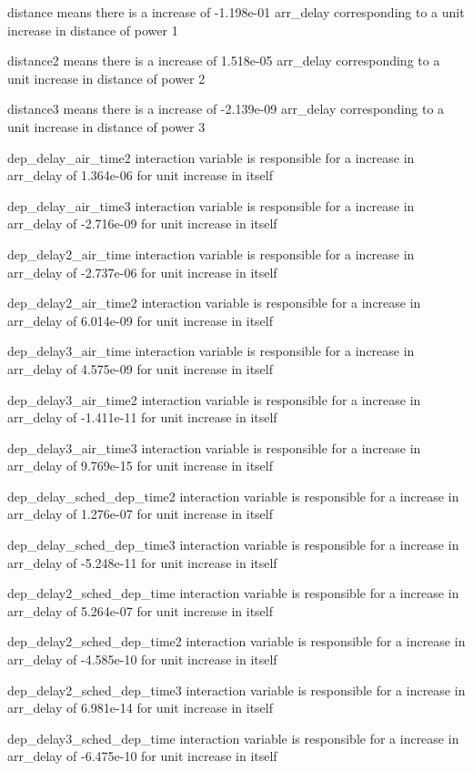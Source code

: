 \documentclass[
]{article}
\begin{document}
distance means there is a increase of -1.198e-01 arr\_delay
corresponding to a unit increase in distance of power 1

distance2 means there is a increase of 1.518e-05 arr\_delay
corresponding to a unit increase in distance of power 2

distance3 means there is a increase of -2.139e-09 arr\_delay
corresponding to a unit increase in distance of power 3

dep\_delay\_air\_time2 interaction variable is responsible for a
increase in arr\_delay of 1.364e-06 for unit increase in itself

dep\_delay\_air\_time3 interaction variable is responsible for a
increase in arr\_delay of -2.716e-09 for unit increase in itself

dep\_delay2\_air\_time interaction variable is responsible for a
increase in arr\_delay of -2.737e-06 for unit increase in itself

dep\_delay2\_air\_time2 interaction variable is responsible for a
increase in arr\_delay of 6.014e-09 for unit increase in itself

dep\_delay3\_air\_time interaction variable is responsible for a
increase in arr\_delay of 4.575e-09 for unit increase in itself

dep\_delay3\_air\_time2 interaction variable is responsible for a
increase in arr\_delay of -1.411e-11 for unit increase in itself

dep\_delay3\_air\_time3 interaction variable is responsible for a
increase in arr\_delay of 9.769e-15 for unit increase in itself

dep\_delay\_sched\_dep\_time2 interaction variable is responsible for a
increase in arr\_delay of 1.276e-07 for unit increase in itself

dep\_delay\_sched\_dep\_time3 interaction variable is responsible for a
increase in arr\_delay of -5.248e-11 for unit increase in itself

dep\_delay2\_sched\_dep\_time interaction variable is responsible for a
increase in arr\_delay of 5.264e-07 for unit increase in itself

dep\_delay2\_sched\_dep\_time2 interaction variable is responsible for a
increase in arr\_delay of -4.585e-10 for unit increase in itself

dep\_delay2\_sched\_dep\_time3 interaction variable is responsible for a
increase in arr\_delay of 6.981e-14 for unit increase in itself

dep\_delay3\_sched\_dep\_time interaction variable is responsible for a
increase in arr\_delay of -6.475e-10 for unit increase in itself
\end{document}
